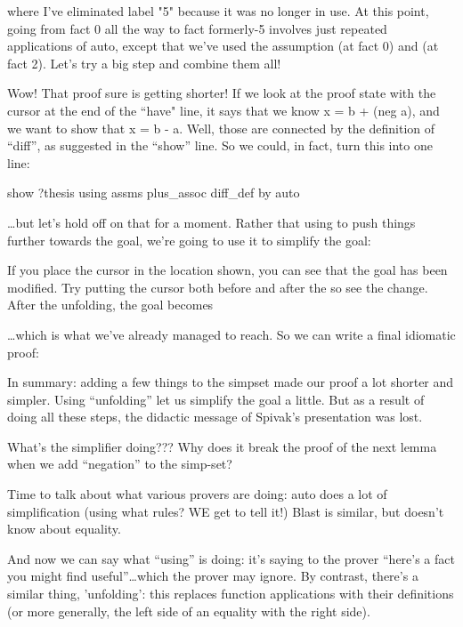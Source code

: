 where I've eliminated label "5" because it was no longer in use. At this point, going from fact 0 all the way to fact formerly-5 involves just repeated applications of auto, except that we've used the assumption (at fact 0) and  (at fact 2). Let's try a big step and combine them all!



Wow! That proof sure is getting shorter! If we look at the proof state with the cursor at the end of the ``have" line, it says that we know x = b + (neg a), and we want to show that x = b - a. Well, those are connected by the definition of ``diff'', as suggested in the ``show'' line. So we could, in fact, turn this into one line:

\begin{IS}    
show ?thesis using  assms plus_assoc  diff_def by auto
\end{IS} 

\ldots but let's hold off on that for a moment. Rather that using  to push things further towards the goal, we're going to use it to simplify the goal:


If you place the cursor in the location shown, you can see that the goal has been modified. Try putting the cursor both before and after the  so see the change. After the unfolding, the goal becomes 

\ldots which is what we've already managed to reach. So we can write a final idiomatic proof:


In summary: adding a few things to the simpset made our proof a lot shorter and simpler. Using ``unfolding'' let us simplify the goal a little. But as a result of doing all these steps, the didactic message of Spivak's presentation was lost. 


What's the simplifier doing???
Why does it break the proof of the next lemma when we add ``negation'' to the simp-set? 

Time to talk about what various provers are doing: auto does a lot of simplification (using what rules? WE get to tell it!) Blast is similar, but doesn't know about equality. 

And now we can say what ``using'' is doing: it's saying to the prover ``here's a fact you might find useful''\ldots which the prover may ignore. By contrast, there's a similar thing, 'unfolding': this replaces function applications with their definitions (or more generally, the left side of an equality with the right side). 

